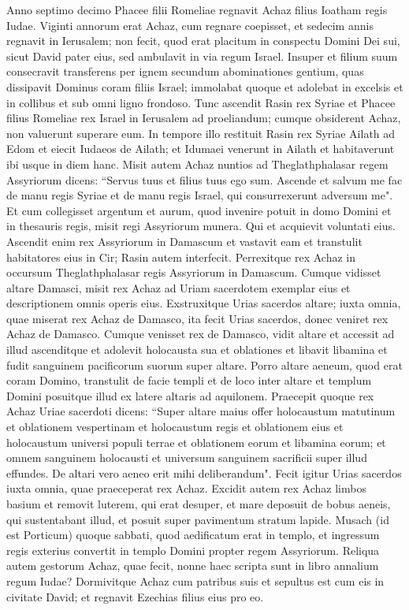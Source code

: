 \begin{biblechapter}  
\verse Anno septimo decimo Phacee filii Romeliae regnavit Achaz filius Ioatham regis Iudae. 
\verse Viginti annorum erat Achaz, cum regnare coepisset, et sedecim annis regnavit in Ierusalem; non fecit, quod erat placitum in conspectu Domini Dei sui, sicut David pater eius, 
\verse sed ambulavit in via regum Israel. Insuper et filium suum consecravit transferens per ignem secundum abominationes gentium, quas dissipavit Dominus coram filiis Israel; 
\verse immolabat quoque et adolebat in excelsis et in collibus et sub omni ligno frondoso. 
\verse Tunc ascendit Rasin rex Syriae et Phacee filius Romeliae rex Israel in Ierusalem ad proeliandum; cumque obsiderent Achaz, non valuerunt superare eum.  
\verse In tempore illo restituit Rasin rex Syriae Ailath ad Edom et eiecit Iudaeos de Ailath; et Idumaei venerunt in Ailath et habitaverunt ibi usque in diem hanc.  
\verse Misit autem Achaz nuntios ad Theglathphalasar regem Assyriorum dicens: “Servus tuus et filius tuus ego sum. Ascende et salvum me fac de manu regis Syriae et de manu regis Israel, qui consurrexerunt adversum me". 
\verse Et cum collegisset argentum et aurum, quod invenire potuit in domo Domini et in thesauris regis, misit regi Assyriorum munera. 
\verse Qui et acquievit voluntati eius. Ascendit enim rex Assyriorum in Damascum et vastavit eam et transtulit habitatores eius in Cir; Rasin autem interfecit. 
\verse Perrexitque rex Achaz in occursum Theglathphalasar regis Assyriorum in Damascum. Cumque vidisset altare Damasci, misit rex Achaz ad Uriam sacerdotem exemplar eius et descriptionem omnis operis eius. 
\verse Exstruxitque Urias sacerdos altare; iuxta omnia, quae miserat rex Achaz de Damasco, ita fecit Urias sacerdos, donec veniret rex Achaz de Damasco. 
\verse Cumque venisset rex de Damasco, vidit altare et accessit ad illud ascenditque 
\verse et adolevit holocausta sua et oblationes et libavit libamina et fudit sanguinem pacificorum suorum super altare. 
\verse Porro altare aeneum, quod erat coram Domino, transtulit de facie templi et de loco inter altare et templum Domini posuitque illud ex latere altaris ad aquilonem. 
\verse Praecepit quoque rex Achaz Uriae sacerdoti dicens: “Super altare maius offer holocaustum matutinum et oblationem vespertinam et holocaustum regis et oblationem eius et holocaustum universi populi terrae et oblationem eorum et libamina eorum; et omnem sanguinem holocausti et universum sanguinem sacrificii super illud effundes. De altari vero aeneo erit mihi deliberandum". 
\verse Fecit igitur Urias sacerdos iuxta omnia, quae praeceperat rex Achaz. 
\verse Excidit autem rex Achaz limbos basium et removit luterem, qui erat desuper, et mare deposuit de bobus aeneis, qui sustentabant illud, et posuit super pavimentum stratum lapide. 
\verse Musach (id est Porticum) quoque sabbati, quod aedificatum erat in templo, et ingressum regis exterius convertit in templo Domini propter regem Assyriorum. 
\verse Reliqua autem gestorum Achaz, quae fecit, nonne haec scripta sunt in libro annalium regum Iudae? 
\verse Dormivitque Achaz cum patribus suis et sepultus est cum eis in civitate David; et regnavit Ezechias filius eius pro eo. 
\end{biblechapter}


